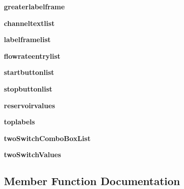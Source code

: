 \begin{DoxyCompactItemize}
{\bfseries greaterlabelframe}
\item 
\mbox{\label{class_g_u_i_1_1_manual_page_ac9d612abd4c9e4d3092e409037e09e80}} 
{\bfseries channeltextlist}
\item 
\mbox{\label{class_g_u_i_1_1_manual_page_a8f91a0a819bcadfdcc1468b668ebc42a}} 
{\bfseries labelframelist}
\item 
\mbox{\label{class_g_u_i_1_1_manual_page_af99dfa99bc1f8b8ac6e5a6b6f5944c71}} 
{\bfseries flowrateentrylist}
\item 
\mbox{\label{class_g_u_i_1_1_manual_page_a16fa24c8f70b2c149b72c3875b8a0970}} 
{\bfseries startbuttonlist}
\item 
\mbox{\label{class_g_u_i_1_1_manual_page_a5bd37d36a07ba48306378791eecf95d4}} 
{\bfseries stopbuttonlist}
\item 
\mbox{\label{class_g_u_i_1_1_manual_page_aa01e7fba33e494110f2813bf072d9d04}} 
{\bfseries reservoirvalues}
\item 
\mbox{\label{class_g_u_i_1_1_manual_page_af6724f6b2794b54ae00224013f7d63a5}} 
{\bfseries toplabels}
\item 
\mbox{\label{class_g_u_i_1_1_manual_page_a26ec232a2655d365c6984d9337ba5e67}} 
{\bfseries two\+Switch\+Combo\+Box\+List}
\item 
\mbox{\label{class_g_u_i_1_1_manual_page_a72ed3ad40742bf9e1d3c3c549b76f7c4}} 
{\bfseries two\+Switch\+Values}
\end{DoxyCompactItemize}


\subsection{Member Function Documentation}
\mbox{\label{class_g_u_i_1_1_manual_page_aa7967ed411dd9846fd92f65b494972cf}} 
